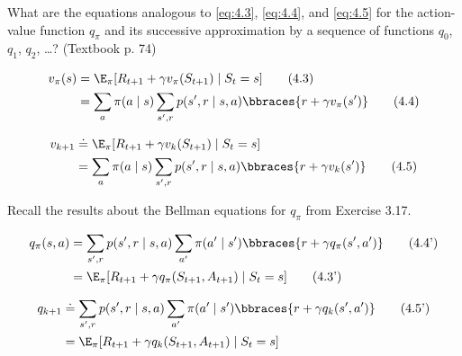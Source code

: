 
\begin{exercise}[Exercise 4.3]

What are the equations analogous to \eqref{eq:4.3}, \eqref{eq:4.4}, and \eqref{eq:4.5} for the action-value function $q_\pi$ and its successive approximation by a sequence of functions $q_0$, $q_1$, $q_2$, \dots?
(Textbook p. 74)

\begin{subequations}
    \begin{align*}
        v_\pi(s)
        & =
        \E_\pi[R_{t+1} + \gamma v_\pi(S_{t+1}) \mid S_t = s] \label{eq:4.3} \tag{4.3} \\
        & =
        \sum_a
            \pi(a \mid s)
            \sum_{s^\prime, r}
                p(s^\prime, r \mid s, a)
                \bbraces{r + \gamma v_\pi(s^\prime)} \label{eq:4.4} \tag{4.4}
    \end{align*}
\end{subequations}

\begin{align*}
    v_{k+1}
    & \doteq
    \E_\pi[R_{t+1} + \gamma v_k(S_{t+1}) \mid S_t = s] \\
    & =
    \sum_a
        \pi(a \mid s)
        \sum_{s^\prime, r}
            p(s^\prime, r \mid s, a)
            \bbraces{r + \gamma v_k(s^\prime)} \label{eq:4.5} \tag{4.5}
\end{align*}

\end{exercise}


\begin{solution}

Recall the results about the Bellman equations for $q_\pi$ from Exercise 3.17.

\begin{align*}
    q_\pi(s, a)
    & =
    \sum_{s^\prime, r}
        p(s^\prime, r \mid s, a)
        \sum_{a^\prime}
            \pi(a^\prime \mid s^\prime)
            \bbraces{r + \gamma q_\pi(s^\prime, a^\prime)} \tag{4.4'} \\
    & =
    \E_\pi[R_{t+1} + \gamma q_\pi(S_{t+1}, A_{t+1}) \mid S_t = s] \tag{4.3'}
\end{align*}

\begin{align*}
    q_{k+1}
    & \doteq
    \sum_{s^\prime, r}
        p(s^\prime, r \mid s, a)
        \sum_{a^\prime}
            \pi(a^\prime \mid s^\prime)
            \bbraces{r + \gamma q_k(s^\prime, a^\prime)} \tag{4.5'} \\
    & =
    \E_\pi[R_{t+1} + \gamma q_k(S_{t+1}, A_{t+1}) \mid S_t = s]
\end{align*}

\end{solution}

